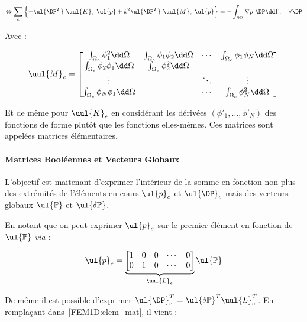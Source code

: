 \begin{equation}
	\Leftrightarrow \sum_e\left\{- \ul{\DP^T}~\uul{K}_e~\ul{p} + k^2 \ul{\DP^T}~\uul{M}_e~\ul{p} \right\} = -\int_{\partial\Omega}\nabla p~\DP\dd\Gamma, \quad \forall\DP\label{FEM1D:elem_mat}\\
\end{equation}

Avec :

\begin{equation*}
	\uul{M}_e = \begin{bmatrix}
		\int_{\Omega_e}\phi_1^2\dd\Omega & \int_{\Omega_e}\phi_1\phi_2\dd\Omega & \cdots  &\int_{\Omega_e}\phi_1\phi_N\dd\Omega\\
		\int_{\Omega_e}\phi_2\phi_1\dd\Omega & \int_{\Omega_e}\phi_2^2\dd\Omega & &\\
		\vdots & & \ddots & \vdots\\
		\int_{\Omega_e}\phi_N\phi_1\dd\Omega & & \cdots & \int_{\Omega_e}\phi_N^2\dd\Omega
	\end{bmatrix}
\end{equation*}

Et de même pour $\uul{K}_e$ en considérant les dérivées $(\phi'_1,\ldots,\phi'_N)$ des fonctions de forme plutôt que les
fonctions elles-mêmes. Ces matrices sont appelées matrices élémentaires.

\paragraph{Matrices Booléennes et Vecteurs Globaux}
\newcommand{\GP}{\ul{\mathbb{P}}}
\newcommand{\GDP}{\ul{\delta\mathbb{P}}}
L'objectif est maitenant d'exprimer l'intérieur de la somme en fonction non plus des extrémités de l'éléments en cours
$\ul{p}_e$ et $\ul{\DP}_e$ mais des vecteurs globaux $\GP$ et $\GDP$.

En notant que on peut exprimer $\ul{p}_e$ sur le premier élément en fonction de $\GP$ \textit{via} :

\begin{equation*}
    \ul{p}_e =
    \underbrace{\begin{bmatrix}
         1 & 0 & 0 & \cdots & 0\\
         0 & 1 & 0 & \cdots & 0
    \end{bmatrix}}_{\uul{L}_e}\GP
\end{equation*}

De même il est possible d'exprimer $\ul{\DP}_e^T = \GDP^T\uul{L}_e^T$. En remplaçant dans~\eqref{FEM1D:elem_mat}, il
vient :


